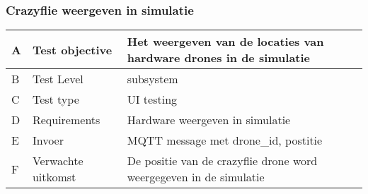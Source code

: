 \subsubsection{Crazyflie weergeven in simulatie}

\begin{table}[hbt!]
    \begin{tabular}[t]{|m{0.3cm}|m{3.2cm}|m{7.5cm}|}\hline
    A & Test objective & Het weergeven van de locaties van hardware drones in de simulatie\\ \hline
    B & Test Level & subsystem\\ \hline
    C & Test type & UI testing\\ \hline
    D & Requirements & Hardware weergeven in simulatie\\ \hline
    E & Invoer & MQTT message met drone\_id, postitie\\ \hline
    F & Verwachte uitkomst & De positie van de crazyflie drone word weergegeven in de simulatie\\ \hline
    \end{tabular}
\end{table}